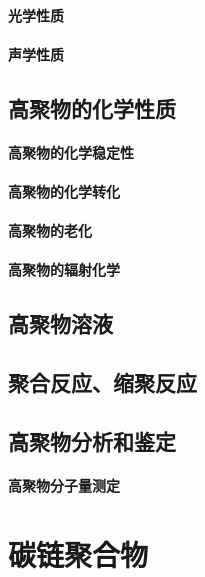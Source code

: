 \documentclass[UTF8]{../03-Chemistry}
\begin{document}
    \subsubsection{光学性质}
    \subsubsection{声学性质}
\section{高聚物的化学性质}
    \subsubsection{高聚物的化学稳定性}
    \subsubsection{高聚物的化学转化}
    \subsubsection{高聚物的老化}
    \subsubsection{高聚物的辐射化学}
\section{高聚物溶液}
\section{聚合反应、缩聚反应}
\section{高聚物分析和鉴定}
    \subsubsection{高聚物分子量测定}











    



\chapter{碳链聚合物}
\end{document}
